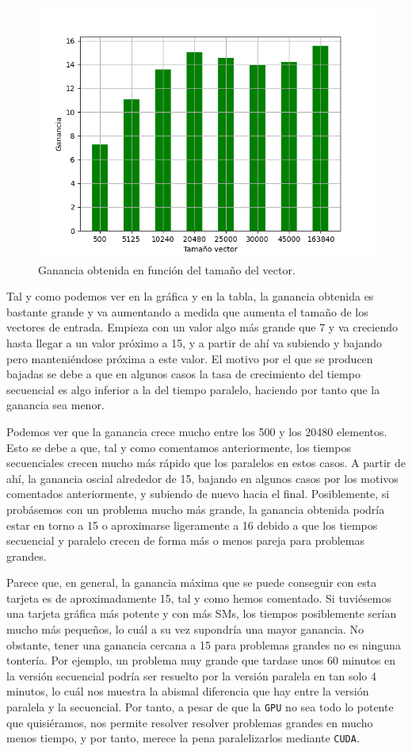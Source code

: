 \documentclass[11pt,a4paper]{article}
\begin{document}
\begin{figure}[H]
  \centering
  \includegraphics[scale=0.6]{img/speedup}
  \caption{Ganancia obtenida en función del tamaño del vector.}
\end{figure}

Tal y como podemos ver en la gráfica y en la tabla, la ganancia obtenida es bastante grande y
va aumentando a medida que aumenta el tamaño de los vectores de entrada. Empieza con un
valor algo más grande que 7 y va creciendo hasta llegar a un valor próximo a 15, y a partir
de ahí va subiendo y bajando pero manteniéndose próxima a este valor. El motivo por el
que se producen bajadas se debe a que en algunos casos la tasa de crecimiento del tiempo
secuencial es algo inferior a la del tiempo paralelo, haciendo por tanto que la ganancia
sea menor.

Podemos ver que la ganancia crece mucho entre los 500 y los 20480 elementos. Esto se
debe a que, tal y como comentamos anteriormente, los tiempos secuenciales crecen mucho
más rápido que los paralelos en estos casos. A partir de ahí, la ganancia oscial alrededor
de 15, bajando en algunos casos por los motivos comentados anteriormente, y subiendo de
nuevo hacia el final. Posiblemente, si probásemos con un problema mucho más grande, la ganancia
obtenida podría estar en torno a 15 o aproximarse ligeramente a 16 debido a que los tiempos
secuencial y paralelo crecen de forma más o menos pareja para problemas grandes.

Parece que, en general, la ganancia máxima que se puede conseguir con esta tarjeta es
de aproximadamente 15, tal y como hemos comentado. Si tuviésemos una tarjeta gráfica más
potente y con más SMs, los tiempos posiblemente serían mucho más pequeños, lo cuál a su vez
supondría una mayor ganancia. No obstante, tener una ganancia cercana a 15 para problemas grandes
no es ninguna tontería. Por ejemplo, un problema muy grande que tardase unos 60 minutos en la
versión secuencial podría ser resuelto por la versión paralela en tan solo 4 minutos, lo cuál
nos muestra la abismal diferencia que hay entre la versión paralela y la secuencial.
Por tanto, a pesar de que la \texttt{GPU} no sea todo lo potente que quisiéramos, nos permite
resolver resolver problemas grandes en mucho menos tiempo, y por tanto, merece la pena
paralelizarlos mediante \texttt{CUDA}.
\end{document}
